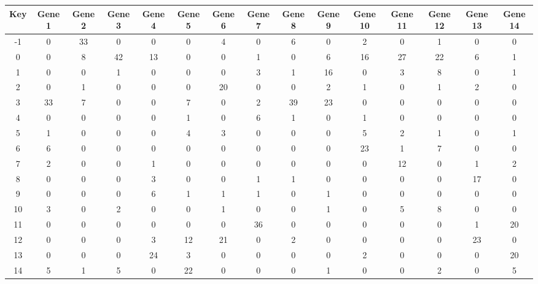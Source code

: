 \begin{tabular}{|c|c|c|c|c|c|c|c|c|c|c|c|c|c|c|}
\hline
Key & Gene 1 & Gene 2 & Gene 3 & Gene 4 & Gene 5 & Gene 6 & Gene 7 & Gene 8 & Gene 9 & Gene 10 & Gene 11 & Gene 12 & Gene 13 & Gene 14 \\
\hline
-1 & 0 & 33 & 0 & 0 & 0 & 4 & 0 & 6 & 0 & 2 & 0 & 1 & 0 & 0 \\
0 & 0 & 8 & 42 & 13 & 0 & 0 & 1 & 0 & 6 & 16 & 27 & 22 & 6 & 1 \\
1 & 0 & 0 & 1 & 0 & 0 & 0 & 3 & 1 & 16 & 0 & 3 & 8 & 0 & 1 \\
2 & 0 & 1 & 0 & 0 & 0 & 20 & 0 & 0 & 2 & 1 & 0 & 1 & 2 & 0 \\
3 & 33 & 7 & 0 & 0 & 7 & 0 & 2 & 39 & 23 & 0 & 0 & 0 & 0 & 0 \\
4 & 0 & 0 & 0 & 0 & 1 & 0 & 6 & 1 & 0 & 1 & 0 & 0 & 0 & 0 \\
5 & 1 & 0 & 0 & 0 & 4 & 3 & 0 & 0 & 0 & 5 & 2 & 1 & 0 & 1 \\
6 & 6 & 0 & 0 & 0 & 0 & 0 & 0 & 0 & 0 & 23 & 1 & 7 & 0 & 0 \\
7 & 2 & 0 & 0 & 1 & 0 & 0 & 0 & 0 & 0 & 0 & 12 & 0 & 1 & 2 \\
8 & 0 & 0 & 0 & 3 & 0 & 0 & 1 & 1 & 0 & 0 & 0 & 0 & 17 & 0 \\
9 & 0 & 0 & 0 & 6 & 1 & 1 & 1 & 0 & 1 & 0 & 0 & 0 & 0 & 0 \\
10 & 3 & 0 & 2 & 0 & 0 & 1 & 0 & 0 & 1 & 0 & 5 & 8 & 0 & 0 \\
11 & 0 & 0 & 0 & 0 & 0 & 0 & 36 & 0 & 0 & 0 & 0 & 0 & 1 & 20 \\
12 & 0 & 0 & 0 & 3 & 12 & 21 & 0 & 2 & 0 & 0 & 0 & 0 & 23 & 0 \\
13 & 0 & 0 & 0 & 24 & 3 & 0 & 0 & 0 & 0 & 2 & 0 & 0 & 0 & 20 \\
14 & 5 & 1 & 5 & 0 & 22 & 0 & 0 & 0 & 1 & 0 & 0 & 2 & 0 & 5 \\
\hline
\end{tabular}
